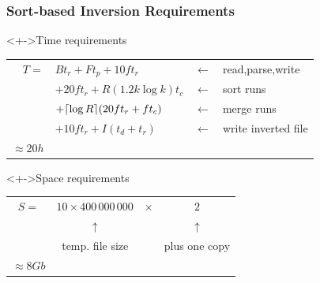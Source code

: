 \documentclass[svgnames]{beamer}
\begin{document}
\begin{frame}
    \frametitle{Sort-based Inversion Requirements}
    
    \begin{exampleblock}<+->{Time requirements}
        \begin{tabular}{rlcl}
            $T =$ & $Bt_r + Ft_p + 10ft_r$ & $\leftarrow$ & read,parse,write \\
            & $+20ft_r + R(1.2k\log k)t_c$ & $\leftarrow$ & sort runs \\
            & $+\lceil \log R \rceil(20ft_r + ft_c)$ & $\leftarrow$ & merge runs \\
            & $+10ft_r + I(t_d + t_r)$ & $\leftarrow$ & write inverted file \\
            \emph{$\approx 20h$}
        \end{tabular}
    \end{exampleblock}


    \begin{exampleblock}<+->{Space requirements}
        \begin{tabular}{cccc}
            $S =$ & $10 \times 400\,000\,000$ & $\times$ & $2$\\
            & $\uparrow$ & & $\uparrow$ \\
            & temp. file size & & plus one copy \\
            \emph{$\approx 8 Gb$}
        \end{tabular}
    \end{exampleblock}

\end{frame}
\end{document}
